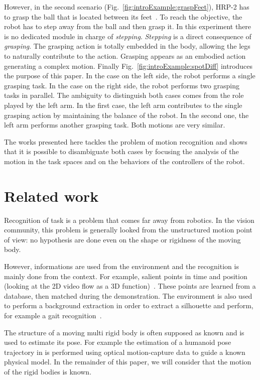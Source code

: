 \documentclass[journal]{IEEEtran}
\begin{document}
However, in the second scenario (Fig.~\ref{fig:introExample:graspFeet}),
HRP-2 has to grasp the ball that is located between its feet~\cite{kanoun10}. To reach the
objective, the robot has to step away from the ball and then grasp it. In this
experiment there is no dedicated module in charge of \emph{stepping}. \emph{Stepping} is
a direct consequence of \emph{grasping}. The grasping action is totally embedded in
the body, allowing the legs to naturally contribute to the action. Grasping
appears as an embodied action generating a complex motion. Finally Fig.~\ref{fig:introExample:spotDiff}
introduces the purpose of this paper. In the case on the left side, the robot
performs a single grasping task. In the case on the right side, the robot
performs two grasping tasks in parallel. The ambiguity to distinguish both
cases comes from the role played by the left arm. In the first case, the left
arm contributes to the single grasping action by maintaining the balance of the
robot. In the second one, the left arm performs another grasping task. Both
motions are very similar. 

The works presented here tackles the problem of motion recognition and 
shows that it is possible to disambiguate both cases by focusing
the analysis of the motion in the task spaces and on
the behaviors of the controllers of the robot.

\section{Related work}
Recognition of task is a problem that comes far away from robotics.
In the vision community, this problem is generally looked from the
unstructured motion point of view: no hypothesis are done
even on the shape or rigidness of the moving body.

However, informations are used from the environment and the recognition is mainly done from
the context. For example, salient points in time and position (looking at the 2D video
flow as a 3D function)~\cite{laptev05}. These points are learned from a database, then
matched during the demonstration. The environment is also used to perform
a background extraction in order to extract a silhouette and perform, for
example a gait recognition~\cite{liu05}.

The structure of a moving multi rigid body is often supposed as known
and is used to estimate its pose. For example the estimation
of a humanoid pose trajectory in \cite{zordan03} is performed 
using optical motion-capture data to guide a known physical model.
In the remainder of this paper, we will consider that the motion of the rigid bodies is known.
\end{document}
